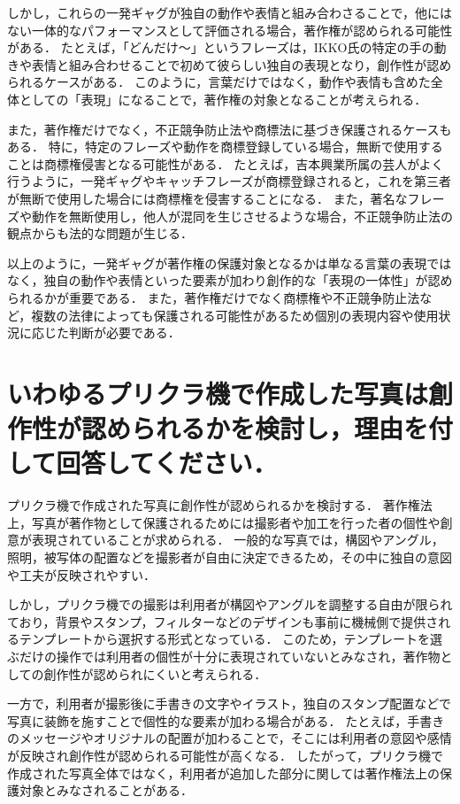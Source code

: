 \documentclass[titlepage,a4paper]{jsarticle}
\begin{document}
しかし，これらの一発ギャグが独自の動作や表情と組み合わさることで，他にはない一体的なパフォーマンスとして評価される場合，著作権が認められる可能性がある．
たとえば，「どんだけ〜」というフレーズは，IKKO氏の特定の手の動きや表情と組み合わせることで初めて彼らしい独自の表現となり，創作性が認められるケースがある．
このように，言葉だけではなく，動作や表情も含めた全体としての「表現」になることで，著作権の対象となることが考えられる\cite{5_4}．

また，著作権だけでなく，不正競争防止法や商標法に基づき保護されるケースもある．
特に，特定のフレーズや動作を商標登録している場合，無断で使用することは商標権侵害となる可能性がある．
たとえば，吉本興業所属の芸人がよく行うように，一発ギャグやキャッチフレーズが商標登録されると，これを第三者が無断で使用した場合には商標権を侵害することになる．
また，著名なフレーズや動作を無断使用し，他人が混同を生じさせるような場合，不正競争防止法の観点からも法的な問題が生じる\cite{5_5}\cite{5_6}．

以上のように，一発ギャグが著作権の保護対象となるかは単なる言葉の表現ではなく，独自の動作や表情といった要素が加わり創作的な「表現の一体性」が認められるかが重要である．
また，著作権だけでなく商標権や不正競争防止法など，複数の法律によっても保護される可能性があるため個別の表現内容や使用状況に応じた判断が必要である．
\section{いわゆるプリクラ機で作成した写真は創作性が認められるかを検討し，理由を付して回答してください．}
プリクラ機で作成された写真に創作性が認められるかを検討する．
著作権法上，写真が著作物として保護されるためには撮影者や加工を行った者の個性や創意が表現されていることが求められる．
一般的な写真では，構図やアングル，照明，被写体の配置などを撮影者が自由に決定できるため，その中に独自の意図や工夫が反映されやすい\cite{5_1}．

しかし，プリクラ機での撮影は利用者が構図やアングルを調整する自由が限られており，背景やスタンプ，フィルターなどのデザインも事前に機械側で提供されるテンプレートから選択する形式となっている．
このため，テンプレートを選ぶだけの操作では利用者の個性が十分に表現されていないとみなされ，著作物としての創作性が認められにくいと考えられる．

一方で，利用者が撮影後に手書きの文字やイラスト，独自のスタンプ配置などで写真に装飾を施すことで個性的な要素が加わる場合がある．
たとえば，手書きのメッセージやオリジナルの配置が加わることで，そこには利用者の意図や感情が反映され創作性が認められる可能性が高くなる．
したがって，プリクラ機で作成された写真全体ではなく，利用者が追加した部分に関しては著作権法上の保護対象とみなされることがある．
\end{document}
